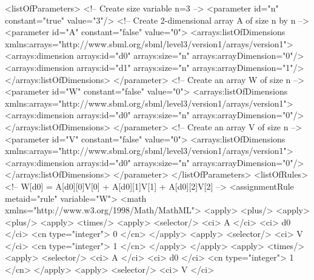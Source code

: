 \begin{example}
    
<listOfParameters>
    <!-- Create size variable n=3 -->
    <parameter id="n" constant="true" value="3"/>
    <!-- Create 2-dimensional array A of size n by n -->
    <parameter id="A" constant="false" value="0">
        <arrays:listOfDimensions
            xmlns:arrays="http://www.sbml.org/sbml/level3/version1/arrays/version1">
            <arrays:dimension arrays:id="d0" arrays:size="n" arrays:arrayDimension="0"/>
            <arrays:dimension arrays:id="d1" arrays:size="n" arrays:arrayDimension="1"/>
        </arrays:listOfDimensions>
    </parameter>
    <!-- Create an array W of size n -->
    <parameter id="W" constant="false" value="0">
        <arrays:listOfDimensions
            xmlns:arrays="http://www.sbml.org/sbml/level3/version1/arrays/version1">
            <arrays:dimension arrays:id="d0" arrays:size="n" arrays:arrayDimension="0"/>
        </arrays:listOfDimensions>
    </parameter>
    <!-- Create an array V of size n -->
    <parameter id="V" constant="false" value="0">
        <arrays:listOfDimensions
            xmlns:arrays="http://www.sbml.org/sbml/level3/version1/arrays/version1">
            <arrays:dimension arrays:id="d0" arrays:size="n" arrays:arrayDimension="0"/>
        </arrays:listOfDimensions>
    </parameter>
</listOfParameters>
<listOfRules>
     <!-- W[d0] = A[d0][0]V[0] + A[d0][1]V[1] + A[d0][2]V[2] -->
    <assignmentRule metaid="rule" variable="W">
        <math xmlns="http://www.w3.org/1998/Math/MathML">
            <apply>
                <plus/>
                <apply>
                    <plus/>
                    <apply>
                        <times/>
                        <apply>
                            <selector/>
                            <ci> A </ci>
                            <ci> d0 </ci>
                            <cn type="integer"> 0 </cn>
                        </apply>
                        <apply>
                            <selector/>
                            <ci> V </ci>
                            <cn type="integer"> 1 </cn>
                        </apply>
                    </apply>
                    <apply>
                        <times/>
                        <apply>
                            <selector/>
                            <ci> A </ci>
                            <ci> d0 </ci>
                            <cn type="integer"> 1 </cn>
                        </apply>
                        <apply>
                            <selector/>
                            <ci> V </ci>

\end{example}
